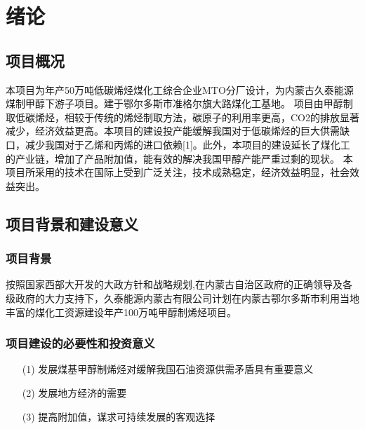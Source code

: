 \chapter{绪论}

\section{项目概况}
本项目为年产50万吨低碳烯烃煤化工综合企业MTO分厂设计，为内蒙古久泰能源煤制甲醇下游子项目。建于鄂尔多斯市准格尔旗大路煤化工基地。
项目由甲醇制取低碳烯烃，相较于传统的烯烃制取方法，碳原子的利用率更高，CO2的排放显著减少，经济效益更高。本项目的建设投产能缓解我国对于低碳烯烃的巨大供需缺口，减少我国对于乙烯和丙烯的进口依赖[1]。此外，本项目的建设延长了煤化工的产业链，增加了产品附加值，能有效的解决我国甲醇产能严重过剩的现状。
本项目所采用的技术在国际上受到广泛关注，技术成熟稳定，经济效益明显，社会效益突出。

\section{项目背景和建设意义}

\subsection{项目背景}
按照国家西部大开发的大政方针和战略规划,在内蒙古自治区政府的正确领导及各级政府的大力支持下，久泰能源内蒙古有限公司计划在内蒙古鄂尔多斯市利用当地丰富的煤化工资源建设年产100万吨甲醇制烯烃项目。

\subsection{项目建设的必要性和投资意义}
\begin{itemize}[noitemsep,topsep=0pt,parsep=0pt,partopsep=0pt]
	\item[(1)] 发展煤基甲醇制烯烃对缓解我国石油资源供需矛盾具有重要意义
	\item[(2)] 发展地方经济的需要
	\item[(3)] 提高附加值，谋求可持续发展的客观选择
\end{itemize}


